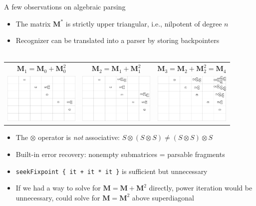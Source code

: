 \documentclass{beamer}
\begin{document}
    \begin{frame}{A few observations on algebraic parsing}
        \begin{itemize}
            \item The matrix $\mathbf M^*$ is strictly upper triangular, i.e., nilpotent of degree $n$
            \item Recognizer can be translated into a parser by storing backpointers\\\\
        \end{itemize}\vspace{0.2cm}
        \begin{tabular}{ c c c }
            \small{$\mathbf{M}_1 = \mathbf{M}_0 + \mathbf{M}_0^2$} & \small{$\mathbf{M}_2 = \mathbf{M}_1 + \mathbf{M}_1^2$} & \small{$\mathbf{M}_3 = \mathbf{M}_2 + \mathbf{M}_2^2 = \mathbf{M}_4$} \\
            \includegraphics[trim=420 288 0 0,clip, width=3.6cm]{../figures/parse2.png} &
            \includegraphics[trim=420 285 0 0,clip, width=3.6cm]{../figures/parse3.png} &
            \includegraphics[trim=420 287 0 0,clip, width=3.63cm]{../figures/parse4.png}
        \end{tabular}
        \begin{itemize}
            \item The $\otimes$ operator is \textit{not} associative: $S \otimes (S \otimes S) \neq (S \otimes S) \otimes S$
            \item Built-in error recovery: nonempty submatrices = parsable fragments
            \item \texttt{seekFixpoint \{ it + it * it \}} is sufficient but unnecessary
            \item If we had a way to solve for $\mathbf{M = M + M}^2$ directly, power iteration would be unnecessary, could solve for $\mathbf{M = M}^2$ above superdiagonal
        \end{itemize}
    \end{frame}
\end{document}
